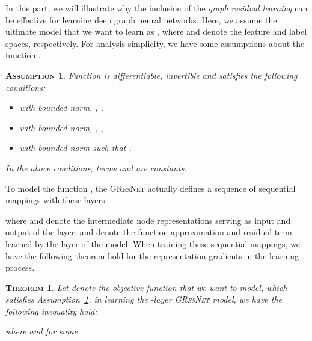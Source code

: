 \documentclass{article}
\newtheorem{theo}{\textsc{Theorem}}
\newtheorem{assumption}{\textsc{Assumption}}
\newcommand{\gresnet}{\textsc{GResNet}}
\begin{document}
In this part, we will illustrate why the inclusion of the \textit{graph residual learning} can be effective for learning deep graph neural networks. Here, we assume the ultimate model that we want to learn as , where  and  denote the feature and label spaces, respectively. For analysis simplicity, we have some assumptions about the function  \cite{ZRS18}.
\begin{assumption}\label{assumption:conditions}
Function  is differentiable, invertible and satisfies the following conditions:
\begin{itemize}
\vspace{-7pt}
\item  with bounded norm, , ,
\vspace{-6pt}
\item  with bounded norm, , ,
\vspace{-6pt}
\item  with bounded norm such that .
\vspace{-7pt}
\end{itemize}
In the above conditions, terms  and  are constants.
\end{assumption}

To model the function , the {\gresnet} actually defines a sequence of  sequential mappings with these  layers:

where  and  denote the intermediate node representations serving as input and output of the  layer.  and  denote the function approximation and residual term learned by the  layer of the model. When training these  sequential mappings, we have the following theorem hold for the representation gradients in the learning process.

\begin{theo}\label{theo:norm_preservation}
Let  denote the objective function that we want to model, which satisfies Assumption~\ref{assumption:conditions}, in learning the -layer {\gresnet} model, we have the following inequality hold:

where  and  for some .
\end{theo}
\end{document}
